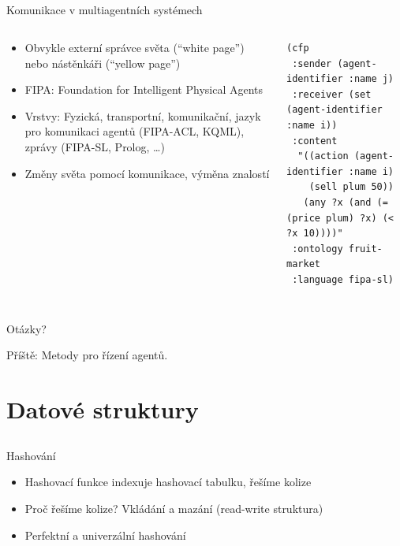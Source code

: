 \documentclass{beamer}
\begin{document}
\subsection{}
\begin{frame}{Komunikace v multiagentních systémech}
\begin{columns}
\begin{column}{5em}
\begin{itemize}
\item Obvykle externí správce světa (``white page'') nebo nástěnkáři (``yellow page'')
\item FIPA: Foundation for Intelligent Physical Agents
\item Vrstvy: Fyzická, transportní, komunikační, jazyk pro komunikaci agentů (FIPA-ACL, KQML), zprávy (FIPA-SL, Prolog, \dots)
\item Změny světa pomocí komunikace, výměna znalostí
\end{itemize}
\end{column}
\begin{column}{6em}
\begin{lstlisting}
(cfp
 :sender (agent-identifier :name j)
 :receiver (set (agent-identifier :name i))
 :content
  "((action (agent-identifier :name i)
    (sell plum 50))
   (any ?x (and (= (price plum) ?x) (< ?x 10))))"
 :ontology fruit-market
 :language fipa-sl)
\end{lstlisting}
\end{column}
\end{columns}
\end{frame}

\subsection{}
\begin{frame}{Otázky?}
\begin{center}
Příště: Metody pro řízení agentů.
\end{center}
\end{frame}

\section{Datové struktury}

\subsection{}
\begin{frame}{Hashování}
\begin{itemize}
\item Hashovací funkce indexuje hashovací tabulku, řešíme kolize
\item Proč řešíme kolize? Vkládání a mazání (read-write struktura)
\item Perfektní a univerzální hashování
\end{itemize}
\end{frame}
\end{document}
